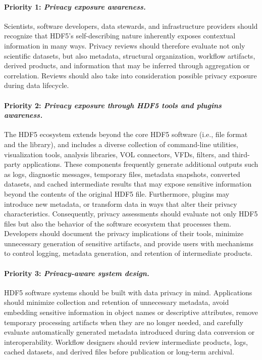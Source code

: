 \documentclass[../main.tex]{subfiles}
\begin{document}
\paragraph{Priority 1: \emph{Privacy exposure awareness.}}
Scientists, software developers, data stewards, and infrastructure providers should 
recognize that HDF5's self-describing nature inherently exposes contextual 
information in many ways. Privacy reviews should therefore evaluate not only 
scientific datasets, but also metadata, structural organization, workflow artifacts, 
derived products, and information that may be inferred through aggregation or 
correlation. Reviews should also take into consideration possible privacy 
exposure during data lifecycle. 

\paragraph{Priority 2: \emph{Privacy exposure through HDF5 tools and plugins awareness.}}
The HDF5 ecosystem extends beyond the core HDF5 software (i.e., file format and the library), 
and includes a diverse collection of command-line utilities, visualization tools, 
analysis libraries, VOL connectors, VFDs, filters, and third-party applications. 
These components frequently generate additional outputs such as logs, diagnostic 
messages, temporary files, metadata snapshots, converted datasets, and cached 
intermediate results that may expose sensitive information beyond the contents of the 
original HDF5 file. Furthermore, plugins may introduce new metadata, or transform 
data in ways that alter their privacy characteristics. Consequently, privacy 
assessments should evaluate not only HDF5 files but also the behavior of the 
software ecosystem that processes them. Developers should document the privacy 
implications of their tools, minimize unnecessary generation of sensitive artifacts, 
and provide users with mechanisms to control logging, metadata generation, and 
retention of intermediate products.

\paragraph{Priority 3: \emph{Privacy-aware system design.}}
HDF5 software systems should be built with data privacy in mind. Applications should 
minimize collection and retention of unnecessary metadata, avoid embedding sensitive 
information in object names or descriptive attributes, remove temporary processing 
artifacts when they are no longer needed, and carefully evaluate automatically 
generated metadata introduced during data conversion or interoperability. 
Workflow designers should review intermediate products, logs, cached datasets, and 
derived files before publication or long-term archival. 
\end{document}
